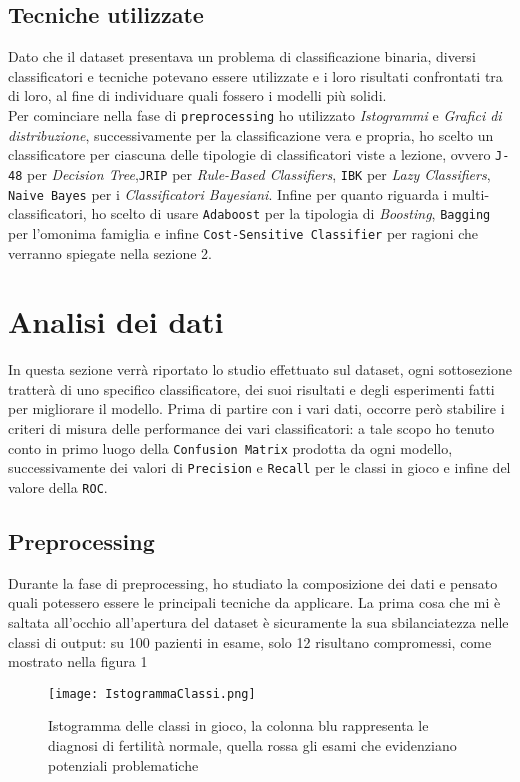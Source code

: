   \subsection{Tecniche utilizzate}
  Dato che il dataset presentava un problema di classificazione binaria, diversi classificatori e tecniche potevano essere utilizzate e i loro risultati confrontati tra di loro, al fine di individuare quali fossero i modelli più solidi.\\
  Per cominciare nella fase di \texttt{preprocessing} ho utilizzato \textit{Istogrammi} e \textit{Grafici di distribuzione}, successivamente per la classificazione vera e propria, ho scelto un classificatore per ciascuna delle tipologie di classificatori viste a lezione, ovvero \texttt{J-48} per \textit{Decision Tree},\texttt{JRIP} per \textit{Rule-Based Classifiers}, \texttt{IBK} per \textit{Lazy Classifiers}, \texttt{Naive Bayes} per i \textit{Classificatori Bayesiani}.
  Infine per quanto riguarda i multi-classificatori, ho scelto di usare \texttt{Adaboost} per la tipologia di \textit{Boosting}, \texttt{Bagging} per l'omonima famiglia e infine \texttt{Cost-Sensitive Classifier} per ragioni che verranno spiegate nella sezione 2.
  \section{Analisi dei dati}
  In questa sezione verrà riportato lo studio effettuato sul dataset, ogni sottosezione tratterà di uno specifico classificatore, dei suoi risultati e degli esperimenti fatti per migliorare il modello.
  Prima di partire con i vari dati, occorre però stabilire i criteri di misura delle performance dei vari classificatori: a tale scopo ho tenuto conto in primo luogo della \texttt{Confusion Matrix} prodotta da ogni modello, successivamente dei valori di \texttt{Precision} e \texttt{Recall} per le classi in gioco e infine del valore della \texttt{ROC}.
  \subsection{Preprocessing}
  Durante la fase di preprocessing, ho studiato la composizione dei dati e pensato quali potessero essere le principali tecniche da applicare.
  La prima cosa che mi è saltata all'occhio all'apertura del dataset è sicuramente la sua sbilanciatezza nelle classi di output: su 100 pazienti in esame, solo 12 risultano compromessi, come mostrato nella figura 1
  
  \begin{figure}[h!]
  	\texttt{[image: IstogrammaClassi.png]}
  	\caption{Istogramma delle classi in gioco, la colonna blu rappresenta le diagnosi di fertilità normale, quella rossa gli esami che evidenziano potenziali problematiche}
  \end{figure}

